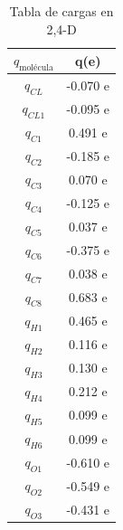 \begin{table}[!h]
    \centering
    \begin{tabular}{|c|c|}
    \hline
    \large{$q_{\text{molécula}}$} & q(e) \\
    \hline
    \large{$q_{CL}$} & -0.070 e \\
    \large{$q_{CL1}$} & -0.095 e \\
    \large{$q_{C1}$} & 0.491 e \\
    \large{$q_{C2}$} & -0.185 e \\
    \large{$q_{C3}$} & 0.070 e \\
    \large{$q_{C4}$} & -0.125 e \\
    \large{$q_{C5}$} & 0.037 e \\
    \large{$q_{C6}$} & -0.375 e \\
    \large{$q_{C7}$} & 0.038 e \\
    \large{$q_{C8}$} & 0.683 e \\
    \large{$q_{H1}$} & 0.465 e \\
    \large{$q_{H2}$} & 0.116 e \\
    \large{$q_{H3}$} & 0.130 e \\
    \large{$q_{H4}$} & 0.212 e \\
    \large{$q_{H5}$} & 0.099 e \\
    \large{$q_{H6}$} & 0.099 e \\
    \large{$q_{O1}$} & -0.610 e \\
    \large{$q_{O2}$} & -0.549 e \\
    \large{$q_{O3}$} & -0.431 e \\
    \hline
    \end{tabular}
    \caption{Tabla de cargas en 2,4-D}
    \label{tab:cargas24D}
\end{table}


